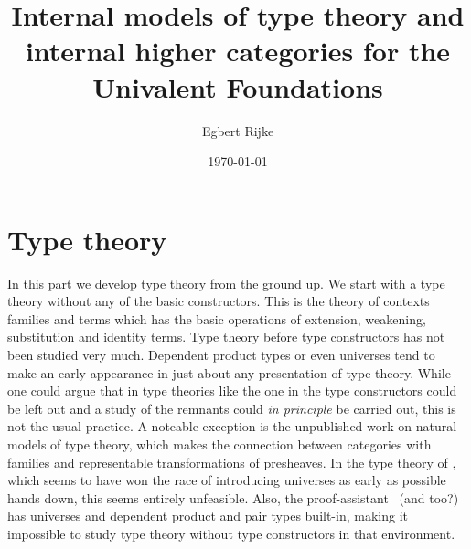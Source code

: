 \documentclass{article}
\title{Internal models of type theory and internal higher categories for the
Univalent Foundations}
\author{Egbert Rijke}
\date{\today}
\begin{document}
\maketitle

\begin{comment}
\begin{abstract}
A project is proposed where we investigate notions of internal models of type
theory and internal higher categories. We take the point of view that an
internal model is an internal higher category with extra structure interpreting
the type constructors. We propose to (1) explore possible definitions of both
notions, (2) find a zoo of examples and (3) find extensions of the underlying
theory and models thereof to include higher inductive types.
\end{abstract}
\end{comment}

\tableofcontents

\begin{comment}
\part{Introduction}
The project proposal is described in \autoref{stage1} and \autoref{stage2}. In
the appendices we give elaborations on the topics discussed in the proposal itself.
By including these we intend to clarify the proposal and present some of the 
(unfinished) work that is already done.





%
\end{comment}

\part{Type theory}

In this part we develop type theory from the ground up. We start with a type
theory without any of the basic constructors. This is the theory of contexts
families and terms which has the basic operations of extension, weakening,
substitution and identity terms. Type theory before type constructors has not
been studied very much. Dependent product types or even universes tend to make
an early appearance in just about any presentation of type theory. While one
could argue that in type theories like the one in \cite{Dybjer1996} the type
constructors could be left out and a study of the remnants could \emph{in
principle} be carried out, this is not the usual practice. A noteable exception
is the unpublished work \cite{Awodey2013} on natural models of type theory,
which makes the connection between categories with families and representable
transformations of presheaves. In the type theory
of \cite{TheBook}, which seems to have won the race of introducing universes
as early as possible hands down, this seems entirely unfeasible. Also, the 
proof-assistant \Coq\ {\color{red}(and \Agda too?)} has universes and dependent product and pair types 
built-in, making it impossible to study type theory without type constructors in 
that environment.
\end{document}
